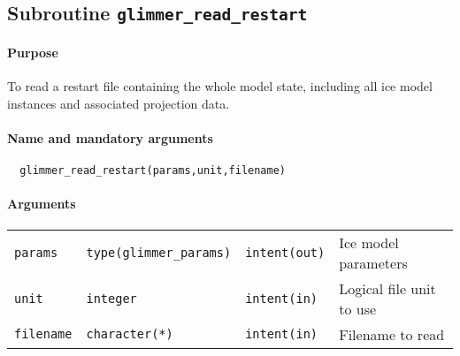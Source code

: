 \documentclass[11pt]{article}
\begin{document}
\subsection{Subroutine \texttt{glimmer\_read\_restart}}
%
\paragraph{Purpose}
%
To read a restart file containing the whole model state, including all ice
model instances and associated projection data.
%
\paragraph{Name and mandatory arguments}
%
\begin{verbatim}
  glimmer_read_restart(params,unit,filename)
\end{verbatim}
%
\paragraph{Arguments}
%
\begin{center}
\begin{tabular}{llll}
\texttt{params} & \texttt{type(glimmer\_params)} & \texttt{intent(out)} &
Ice model parameters \\
\texttt{unit} & \texttt{integer} & \texttt{intent(in)} & Logical file unit to
use \\
\texttt{filename} & \texttt{character(*)} & \texttt{intent(in)} & Filename to
read \\
\end{tabular}
\end{center}
\end{document}
